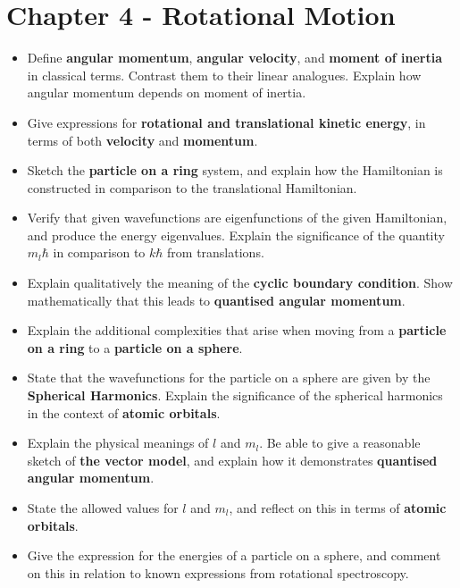 \documentclass{memoir}[11pt,oneside,a4paper,openany]
\begin{document}
\section*{Chapter 4 - Rotational Motion}
\begin{itemize}
	\item Define \textbf{angular momentum}, \textbf{angular velocity}, and \textbf{moment of inertia} in classical terms. Contrast them to their linear analogues. Explain how angular momentum depends on moment of inertia.
	\item Give expressions for \textbf{rotational and translational kinetic energy}, in terms of both \textbf{velocity} and \textbf{momentum}.
	\item Sketch the \textbf{particle on a ring} system, and explain how the Hamiltonian is constructed in comparison to the translational Hamiltonian. 
	\item Verify that given wavefunctions are eigenfunctions of the given Hamiltonian, and produce the energy eigenvalues. Explain the significance of the quantity $m_l\hbar$ in comparison to $k\hbar$ from translations.
	\item Explain qualitatively the meaning of the \textbf{cyclic boundary condition}. Show mathematically that this leads to \textbf{quantised angular momentum}.
	\item Explain the additional complexities that arise when moving from a \textbf{particle on a ring} to a \textbf{particle on a sphere}. 
	\item State that the wavefunctions for the particle on a sphere are given by the \textbf{Spherical Harmonics}. Explain the significance of the spherical harmonics in the context of \textbf{atomic orbitals}.
	\item Explain the physical meanings of $l$ and $m_l$. Be able to give a reasonable sketch of \textbf{the vector model}, and explain how it demonstrates \textbf{quantised angular momentum}. 
	\item State the allowed values for $l$ and $m_l$, and reflect on this in terms of \textbf{atomic orbitals}.
	\item Give the expression for the energies of a particle on a sphere, and comment on this in relation to known expressions from rotational spectroscopy.
\end{itemize}
\end{document}
